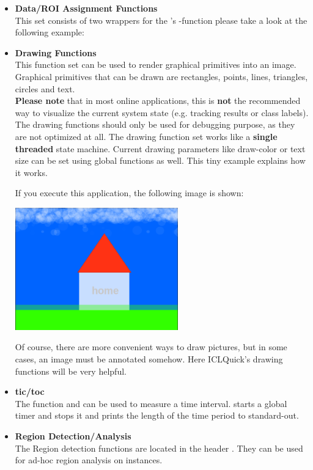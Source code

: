 \begin{itemize}
\item \textbf{Data/ROI Assignment Functions}\\
This set consists of two wrappers for the 's -function please take a look at the following example:


\item \textbf{Drawing Functions}\\
This function set can be used to render graphical primitives into an image. Graphical primitives that can be drawn are rectangles, points, lines, triangles, circles and text.\\
\textbf{Please note} that in most online applications, this is \textbf{not} the recommended way to visualize the current system state (e.g. tracking results or class labels). The drawing functions should only be used for debugging purpose, as they are not optimized at all. The drawing function set works like a \textbf{single threaded} state machine. Current drawing parameters like draw-color or text size can be set using global functions as well. This tiny example explains how it works.


If you execute this application, the following image is shown:

\includegraphics[width=200pt]{media/quick-house.png}

Of course, there are more convenient ways to draw pictures, but in some cases, an image must be annotated somehow. Here ICLQuick's drawing functions will be very helpful.

\item \textbf{tic/toc}\\
The function  and  can be used to measure a time interval.  starts a global timer and  stops it and prints the length of the time period to standard-out. 

\item \textbf{Region Detection/Analysis}\\
The Region detection functions are located in the header . They can be used for ad-hoc region analysis on  instances. 
\end{itemize}




